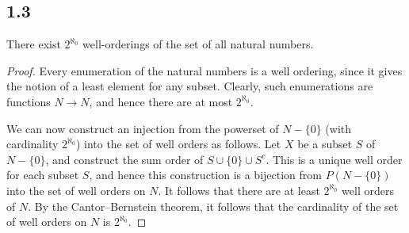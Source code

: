 \subsection*{1.3} There exist $2^{\aleph_0}$ well-orderings of the set of all natural numbers.

\begin{proof}
    Every enumeration of the natural numbers is a well ordering, since it gives the notion of a least element for any subset. Clearly, such enumerations are functions $N \rightarrow N$, and hence there are at most $2^{\aleph_0}$.

    We can now construct an injection from the powerset of $N - \{0\}$ (with cardinality $2^{\aleph_0}$) into the set of well orders as follows. Let $X$ be a subset $S$ of $N - \{0\}$, and construct the sum order of $S \cup \{0\} \cup S^c$. This is a unique well order for each subset $S$, and hence this construction is a bijection from $P(N-\{0\})$ into the set of well orders on $N$. It follows that there are at least $2^{\aleph_0}$ well orders of $N$. By the Cantor–Bernstein theorem, it follows that the cardinality of the set of well orders on $N$ is $2^{\aleph_0}$.
    
\end{proof}


